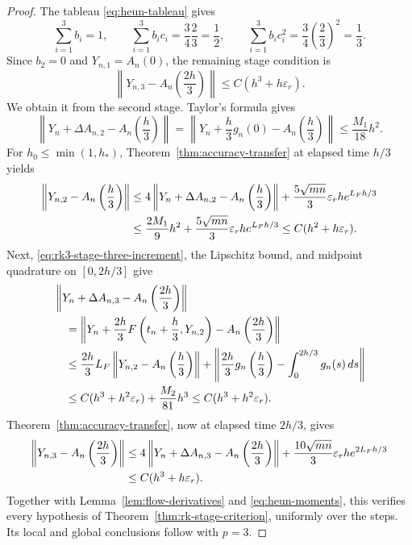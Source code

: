 \documentclass[]{article}
\numberwithin{equation}{section}
\theoremstyle{plain}
\theoremstyle{remark}
\numberwithin{algorithm}{section}
\newcommand{\eps}{\varepsilon}
\begin{document}
\begin{proof}
The tableau \eqref{eq:heun-tableau} gives
\begin{equation}\label{eq:heun-moments}
 \sum_{i=1}^{3}b_i=1,\qquad
 \sum_{i=1}^{3}b_ic_i=\frac34\frac23=\frac12,\qquad
 \sum_{i=1}^{3}b_ic_i^2=\frac34\left(\frac23\right)^2=\frac13.
\end{equation}
Since \(b_2=0\) and \(Y_{n,1}=A_n(0)\), the remaining stage condition is
\[
 \left\|Y_{n,3}-A_n\left(\frac{2h}{3}\right)\right\|
 \le C(h^3+h\eps_r).
\]
We obtain it from the second stage.  Taylor's formula gives
\begin{equation}\label{eq:rk3-first-stage-consistency}
 \left\|Y_n+\Delta A_{n,2}-A_n\left(\frac h3\right)\right\|
 =\left\|Y_n+\frac h3g_n(0)-A_n\left(\frac h3\right)\right\|
 \le\frac{M_1}{18}h^2.
\end{equation}
For \(h_0\le\min(1,h_*)\), Theorem~\ref{thm:accuracy-transfer} at elapsed
time \(h/3\) yields
\begin{align}\label{eq:rk3-second-stage-error}
 \left\|Y_{n,2}-A_n\left(\frac h3\right)\right\|
 &\le4\left\|Y_n+\Delta A_{n,2}-A_n\left(\frac h3\right)\right\|
       +\frac{5\sqrt{mn}}3\eps_rh e^{L_Fh/3}\notag\\
 &\le\frac{2M_1}{9}h^2+\frac{5\sqrt{mn}}3\eps_rh e^{L_Fh/3}
 \le C(h^2+h\eps_r).
\end{align}
Next, \eqref{eq:rk3-stage-three-increment}, the Lipschitz bound, and
midpoint quadrature on \([0,2h/3]\) give
\begin{align}
 &\left\|Y_n+\Delta A_{n,3}-A_n\left(\frac{2h}{3}\right)\right\|\notag\\
 &\quad=\left\|Y_n+\frac{2h}{3}F\left(t_n+\frac h3,Y_{n,2}\right)
                  -A_n\left(\frac{2h}{3}\right)\right\|\notag\\
 &\quad\le\frac{2h}{3}L_F
            \left\|Y_{n,2}-A_n\left(\frac h3\right)\right\|
       +\left\|\frac{2h}{3}g_n\left(\frac h3\right)
                    -\int_0^{2h/3}g_n(s)\,ds\right\|\notag\\
 &\quad\le C(h^3+h^2\eps_r)+\frac{M_2}{81}h^3
       \le C(h^3+h^2\eps_r).
 \label{eq:rk3-third-target-error}
\end{align}
Theorem~\ref{thm:accuracy-transfer}, now at elapsed time \(2h/3\), gives
\begin{align}\label{eq:rk3-third-stage-error}
 \left\|Y_{n,3}-A_n\left(\frac{2h}{3}\right)\right\|
 &\le4\left\|Y_n+\Delta A_{n,3}
                -A_n\left(\frac{2h}{3}\right)\right\|
       +\frac{10\sqrt{mn}}3\eps_rh e^{2L_Fh/3}\notag\\
 &\le C(h^3+h\eps_r).
\end{align}
Together with Lemma~\ref{lem:flow-derivatives} and
\eqref{eq:heun-moments}, this verifies every hypothesis of
Theorem~\ref{thm:rk-stage-criterion}, uniformly over the steps.
Its local and global conclusions follow with \(p=3\).
\end{proof}
\end{document}
